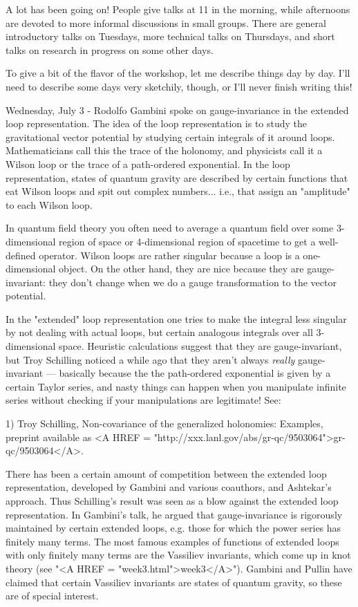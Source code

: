 A lot has been going on!  People give talks at 11 in the morning,
while afternoons are devoted to more informal discussions in small
groups.  There are general introductory talks on Tuesdays, more
technical talks on Thursdays, and short talks on research in progress
on some other days.

To give a bit of the flavor of the workshop, let me describe things
day by day.  I'll need to describe some days very sketchily, though,
or I'll never finish writing this!  

Wednesday, July 3 - Rodolfo Gambini spoke on gauge-invariance in the
extended loop representation.  The idea of the loop representation is
to study the gravitational vector potential by studying certain
integrals of it around loops.  Mathematicians call this the trace of
the holonomy, and physicists call it a Wilson loop or the trace of a
path-ordered exponential.   In the loop representation, states of
quantum gravity are described by certain functions that eat Wilson 
loops and spit out complex numbers... i.e., that assign an "amplitude"
to each Wilson loop.

In quantum field theory you often need to average a quantum field over
some 3-dimensional region of space or 4-dimensional region of
spacetime to get a well-defined operator.  Wilson loops are rather
singular because a loop is a one-dimensional object.  On the other
hand, they are nice because they are gauge-invariant: they don't
change when we do a gauge transformation to the vector potential.

In the "extended" loop representation one tries to make the integral
less singular by not dealing with actual loops, but certain analogous
integrals over all 3-dimensional space.  Heuristic calculations
suggest that they are gauge-invariant, but Troy Schilling noticed a
while ago that they aren't always \emph{really} gauge-invariant ---
basically because the the path-ordered exponential is given by a
certain Taylor series, and nasty things can happen when you manipulate
infinite series without checking if your manipulations are legitimate!
See:

1) Troy Schilling, Non-covariance of the generalized holonomies: Examples, 
preprint available as <A HREF = "http://xxx.lanl.gov/abs/gr-qc/9503064">gr-qc/9503064</A>.  

There has been a certain amount of competition between the extended
loop representation, developed by Gambini and various coauthors, and
Ashtekar's approach.  Thus Schilling's result was seen as a blow
against the extended loop representation.  In Gambini's talk, he
argued that gauge-invariance is rigorously maintained by certain
extended loops, e.g. those for which the power series has finitely
many terms.  The most famous examples of functions of extended loops
with only finitely many terms are the Vassiliev invariants, which come
up in knot theory (see "<A HREF = "week3.html">week3</A>").  Gambini and Pullin have claimed that
certain Vassiliev invariants are states of quantum gravity, so these
are of special interest.

